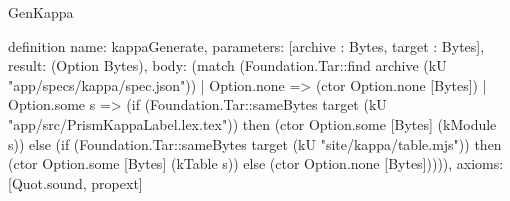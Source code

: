 \begin{lexlean}{GenKappa}
\begin{semanticmodule}
definition{
  name: kappaGenerate,
  parameters: [archive : Bytes, target : Bytes],
  result: (Option Bytes),
  body: (match (Foundation.Tar::find archive (kU "app/specs/kappa/spec.json"))
    | Option.none => (ctor Option.none [Bytes])
    | Option.some s => (if (Foundation.Tar::sameBytes target (kU "app/src/PrismKappaLabel.lex.tex")) then (ctor Option.some [Bytes] (kModule s)) else (if (Foundation.Tar::sameBytes target (kU "site/kappa/table.mjs")) then (ctor Option.some [Bytes] (kTable s)) else (ctor Option.none [Bytes])))),
  axioms: [Quot.sound, propext]
}
\end{semanticmodule}
\end{lexlean}
